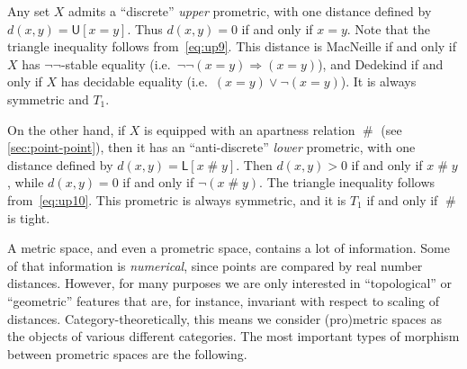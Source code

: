 \documentclass{article}
\def\U[#1]{\mathsf{U}[#1]}
\def\L[#1]{\mathsf{L}[#1]}
\def\apart{\mathrel{\#}}
\let\implies\Rightarrow
\def\nn{\ensuremath{\neg\neg}}
\begin{document}
\begin{eg}
  Any set $X$ admits a ``discrete'' \emph{upper} prometric, with one distance defined by
  \( d(x,y) = \U[x=y] \).
  Thus $d(x,y)=0$ if and only if $x=y$.
  Note that the triangle inequality follows from~\eqref{eq:up9}.
  This distance is MacNeille if and only if $X$ has \nn-stable equality (i.e.\ $\neg\neg(x=y)\implies (x=y)$), and Dedekind if and only if $X$ has decidable equality (i.e.\ $(x=y)\lor \neg(x=y)$).
  It is always symmetric and $T_1$.

  On the other hand, if $X$ is equipped with an apartness relation $\apart$ (see \cref{sec:point-point}), then it has an ``anti-discrete'' \emph{lower} prometric, with one distance defined by
  \( d(x,y) = \L[x\apart y] \).
  Then $d(x,y)>0$ if and only if $x\apart y$, while $d(x,y)=0$ if and only if $\neg(x\apart y)$.
  The triangle inequality follows from~\eqref{eq:up10}.
  This prometric is always symmetric, and it is $T_1$ if and only if $\apart$ is tight.
\end{eg}

A metric space, and even a prometric space, contains a lot of information.
Some of that information is \emph{numerical}, since points are compared by real number distances.
However, for many purposes we are only interested in ``topological'' or ``geometric'' features that are, for instance, invariant with respect to scaling of distances.
Category-theoretically, this means we consider (pro)metric spaces as the objects of various different categories.
The most important types of morphism between prometric spaces are the following.
\end{document}
